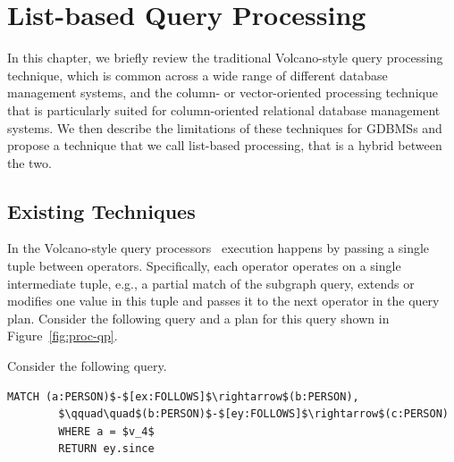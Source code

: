 \chapter{List-based Query Processing}
\label{list-based-processing}

In this chapter, we briefly review the traditional Volcano-style query processing technique, which is common across a wide range of different database management systems, and the column- or vector-oriented processing technique that is particularly suited for column-oriented relational database management systems. We then describe the limitations of these techniques for GDBMSs and propose a technique that we call list-based processing, that is a hybrid between the two.

\section{Existing Techniques}
\label{sec:existing-techniques}
In the Volcano-style query processors~\cite{volcano} execution happens by passing a single tuple between operators. Specifically, each operator operates on a single intermediate tuple, e.g., a partial match of the subgraph query,  extends or modifies one value in this tuple and passes it to the next operator in the query plan.  Consider the following query and a plan for this query shown in Figure~\ref{fig:proc-qp}.

\begin{example}
	\label{ex:proc-example}
	Consider the following query. 
	{\em 
		\begin{lstlisting}[numbers=none,  showstringspaces=false,belowskip=0pt ]
		MATCH (a:PERSON)$-$[ex:FOLLOWS]$\rightarrow$(b:PERSON),
		$\qquad\quad$(b:PERSON)$-$[ey:FOLLOWS]$\rightarrow$(c:PERSON)
		WHERE a = $v_4$
		RETURN ey.since\end{lstlisting}
	}
\end{example}

